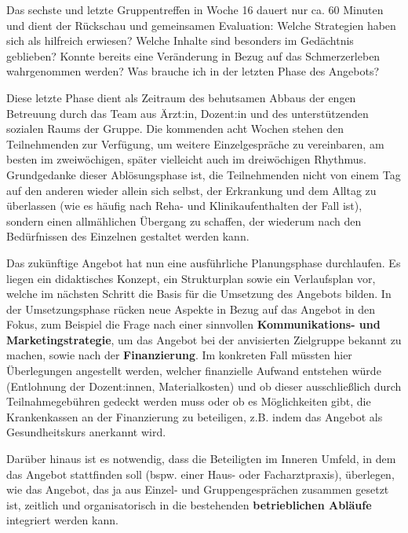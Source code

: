 \documentclass[
  twoside,
  parskip=half-,
]{scrreprt}
\begin{document}
Das sechste und letzte Gruppentreffen in Woche 16 dauert nur ca. 60 Minuten und dient der Rückschau und gemeinsamen Evaluation: Welche Strategien haben sich als hilfreich erwiesen? Welche Inhalte sind besonders im Gedächtnis geblieben? Konnte bereits eine Veränderung in Bezug auf das Schmerzerleben wahrgenommen werden? Was brauche ich in der letzten Phase des Angebots?

Diese letzte Phase dient als Zeitraum des behutsamen Abbaus der engen Betreuung durch das Team aus Ärzt:in, Dozent:in und des unterstützenden sozialen Raums der Gruppe. Die kommenden acht Wochen stehen den Teilnehmenden zur Verfügung, um weitere Einzelgespräche zu vereinbaren, am besten im zweiwöchigen, später vielleicht auch im dreiwöchigen Rhythmus. Grundgedanke dieser Ablösungsphase ist, die Teilnehmenden nicht von einem Tag auf den anderen wieder allein sich selbst, der Erkrankung und dem Alltag zu überlassen (wie es häufig nach Reha- und Klinikaufenthalten der Fall ist), sondern einen allmählichen Übergang zu schaffen, der wiederum nach den Bedürfnissen des Einzelnen gestaltet werden kann. 


Das zukünftige Angebot hat nun eine ausführliche Planungsphase durchlaufen. Es liegen ein didaktisches Konzept, ein Strukturplan sowie ein Verlaufsplan vor, welche im nächsten Schritt die Basis für die Umsetzung des Angebots bilden. In der Umsetzungsphase rücken neue Aspekte in Bezug auf das Angebot in den Fokus, zum Beispiel die Frage nach einer sinnvollen \textbf{Kommunikations- und Marketingstrategie}, um das Angebot bei der anvisierten Zielgruppe bekannt zu machen, sowie nach der \textbf{Finanzierung}. Im konkreten Fall müssten hier Überlegungen angestellt werden, welcher finanzielle Aufwand entstehen würde (Entlohnung der Dozent:innen, Materialkosten) und ob dieser ausschließlich durch Teilnahmegebühren gedeckt werden muss oder ob es Möglichkeiten gibt, die Krankenkassen an der Finanzierung zu beteiligen, z.B. indem das Angebot als Gesundheitskurs anerkannt wird. 

Darüber hinaus ist es notwendig, dass die Beteiligten im Inneren Umfeld, in dem das Angebot stattfinden soll (bspw. einer Haus- oder Facharztpraxis), überlegen, wie das Angebot, das ja aus Einzel- und Gruppengesprächen zusammen gesetzt ist, zeitlich und organisatorisch in die bestehenden \textbf{betrieblichen Abläufe} integriert werden kann. 
\end{document}
